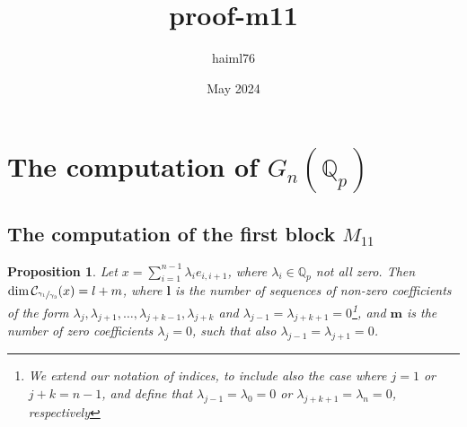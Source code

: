 \documentclass[12pt]{article}
\title{proof-m11}
\author{haiml76 }
\date{May 2024}
\newtheorem{proposition}[theorem]{Proposition}
\begin{document}
\section{The computation of $G_n(\mathbb{Q}_p)$}
\subsection{The computation of the first block $M_{11}$}
\begin{proposition}
\label{prop.centralizer.dimension}
Let $x=\sum_{i=1}^{n-1}\lambda_i e_{i,i+1}$, where $\lambda_i\in\mathbb{Q}_p$ not all zero. Then $\dim\mathcal{C}_{\sfrac{\gamma_1}{\gamma_3}}(x)=l+m$, where $\textbf{l}$ is the number of sequences of non-zero coefficients of the form $\lambda_j,\lambda_{j+1},\dots,\lambda_{j+k-1},\lambda_{j+k}$ and $\lambda_{j-1}=\lambda_{j+k+1}=0$\footnote{We extend our notation of indices, to include also the case where $j=1$ or $j+k=n-1$, and define that $\lambda_{j-1}=\lambda_0=0$ or $\lambda_{j+k+1}=\lambda_n=0$, respectively}, and $\textbf{m}$ is the number of zero coefficients $\lambda_j=0$, such that also $\lambda_{j-1}=\lambda_{j+1}=0$.
\end{proposition}
\end{document}
